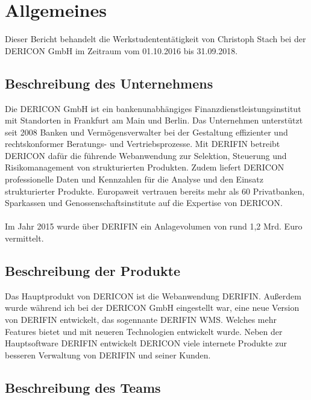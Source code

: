 \documentclass[chapterprefix=false, 12pt, a4paper, oneside, parskip=half, listof=totoc, bibliography=totoc, numbers=noendperiod]{scrbook}
\begin{document}
    \tableofcontents

    \chapter{Allgemeines}

    Dieser Bericht behandelt die Werkstudententätigkeit von Christoph Stach bei der DERICON GmbH im Zeitraum vom 01.10.2016 bis 31.09.2018.

    \section{Beschreibung des Unternehmens}

    Die DERICON GmbH ist ein bankenunabhängiges Finanzdienstleistungsinstitut mit Standorten in Frankfurt am Main und Berlin.
    Das Unternehmen unterstützt seit 2008 Banken und Vermögensverwalter bei der Gestaltung effizienter und rechtskonformer Beratungs- und Vertriebsprozesse.
    Mit DERIFIN betreibt DERICON dafür die führende Webanwendung zur Selektion, Steuerung und Risikomanagement von strukturierten Produkten.
    Zudem liefert DERICON professionelle Daten und Kennzahlen für die Analyse und den Einsatz strukturierter Produkte.
    Europaweit vertrauen bereits mehr als 60 Privatbanken, Sparkassen und Genossenschaftsinstitute auf die Expertise von DERICON.
    \\ \\
    Im Jahr 2015 wurde über DERIFIN ein Anlagevolumen von rund 1,2 Mrd. Euro vermittelt.

    \section{Beschreibung der Produkte}

    Das Hauptprodukt von DERICON ist die Webanwendung DERIFIN. Außerdem wurde während ich bei der DERICON GmbH eingestellt war,
    eine neue Version von DERIFIN entwickelt, das sogennante DERIFIN WMS. Welches mehr Features bietet und mit neueren Technologien entwickelt wurde.
    Neben der Hauptsoftware DERIFIN entwickelt DERICON viele internete Produkte zur besseren Verwaltung von DERIFIN und seiner Kunden.

    \section{Beschreibung des Teams}
\end{document}
